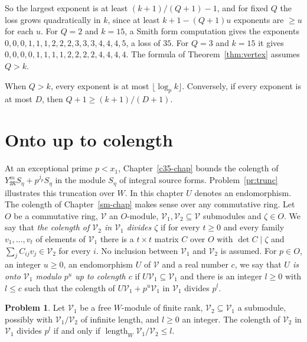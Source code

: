 \documentclass[reqno]{amsart}
\newcounter{chap}
\theoremstyle{definition}
\newtheorem{problem}{Problem}[section]
\theoremstyle{plain}
\newcommand{\len}{\operatorname{length}}
\begin{document}
So the largest exponent is at least \((k+1)/(Q+1) - 1\), and for fixed \(Q\) the loss grows quadratically in \(k\), since at least \(k + 1 - (Q+1)u\) exponents are \(\ge u\) for each \(u\).  For \(Q = 2\) and \(k = 15\), a Smith form computation gives the exponents \(0, 0, 0, 1, 1, 1, 2, 2, 2, 3, 3, 3, 4, 4, 4, 5\), a loss of \(35\).  For \(Q = 3\) and \(k = 15\) it gives \(0, 0, 0, 0, 1, 1, 1, 1, 2, 2, 2, 2, 4, 4, 4, 4\).  The formula of Theorem~\ref{thm:vertex} assumes \(Q > k\).

When \(Q > k\), every exponent is at most \(\lfloor \log_p k \rfloor\).  Conversely, if every exponent is at most \(D\), then \(Q + 1 \ge (k+1)/(D+1)\).

\section{Onto up to colength}\label{sec:colength}

At an exceptional prime \(p < x_1\), Chapter~\ref{c35-chap} bounds the colength of \(Y_{\mathfrak M}^m S_\eta + p^{j_p} S_\eta\) in the module \(S_\eta\) of integral source forms.  Problem~\ref{pr:trunc} illustrates this truncation over \(W\).  In this chapter \(U\) denotes an endomorphism.  The colength of Chapter~\ref{sm-chap} makes sense over any commutative ring.  Let \(O\) be a commutative ring, \(\mathcal V\) an \(O\)-module, \(\mathcal V_1, \mathcal V_2 \subseteq \mathcal V\) submodules and \(\zeta \in O\).  We say that \emph{the colength of \(\mathcal V_2\) in \(\mathcal V_1\) divides \(\zeta\)} if for every \(t \ge 0\) and every family \(v_1, \dots, v_t\) of elements of \(\mathcal V_1\) there is a \(t \times t\) matrix \(C\) over \(O\) with \(\det C \mid \zeta\) and \(\sum_j C_{ij} v_j \in \mathcal V_2\) for every \(i\).  No inclusion between \(\mathcal V_1\) and \(\mathcal V_2\) is assumed.  For \(p \in O\), an integer \(u \ge 0\), an endomorphism \(U\) of \(\mathcal V\) and a real number \(c\), we say that \emph{\(U\) is onto \(\mathcal V_1\) modulo \(p^u\) up to colength \(c\)} if \(U\mathcal V_1 \subseteq \mathcal V_1\) and there is an integer \(l \ge 0\) with \(l \le c\) such that the colength of \(U\mathcal V_1 + p^u \mathcal V_1\) in \(\mathcal V_1\) divides \(p^l\).

\begin{problem}\label{pr:colength}
Let \(\mathcal V_1\) be a free \(W\)-module of finite rank, \(\mathcal V_2 \subseteq \mathcal V_1\) a submodule, possibly with \(\mathcal V_1/\mathcal V_2\) of infinite length, and \(l \ge 0\) an integer.  The colength of \(\mathcal V_2\) in \(\mathcal V_1\) divides \(p^l\) if and only if \(\len_W \mathcal V_1/\mathcal V_2 \le l\).
\end{problem}
\end{document}
